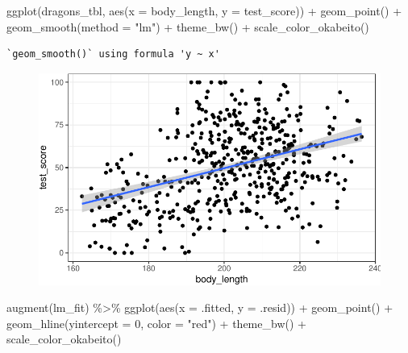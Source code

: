 \documentclass[
  letterpaper,
  DIV=11,
  oneside]{scrreport}
\newenvironment{Shaded}{\begin{snugshade}}{\end{snugshade}}
\newcommand{\AttributeTok}[1]{\textcolor[rgb]{0.40,0.45,0.13}{#1}}
\newcommand{\DecValTok}[1]{\textcolor[rgb]{0.68,0.00,0.00}{#1}}
\newcommand{\FunctionTok}[1]{\textcolor[rgb]{0.28,0.35,0.67}{#1}}
\newcommand{\NormalTok}[1]{\textcolor[rgb]{0.00,0.23,0.31}{#1}}
\newcommand{\SpecialCharTok}[1]{\textcolor[rgb]{0.37,0.37,0.37}{#1}}
\newcommand{\StringTok}[1]{\textcolor[rgb]{0.13,0.47,0.30}{#1}}
\begin{document}
\begin{Shaded}
\begin{Highlighting}[]
\FunctionTok{ggplot}\NormalTok{(dragons\_tbl, }\FunctionTok{aes}\NormalTok{(}\AttributeTok{x =}\NormalTok{ body\_length, }\AttributeTok{y =}\NormalTok{ test\_score)) }\SpecialCharTok{+}
  \FunctionTok{geom\_point}\NormalTok{() }\SpecialCharTok{+}
  \FunctionTok{geom\_smooth}\NormalTok{(}\AttributeTok{method =} \StringTok{"lm"}\NormalTok{) }\SpecialCharTok{+}
  \FunctionTok{theme\_bw}\NormalTok{() }\SpecialCharTok{+}
  \FunctionTok{scale\_color\_okabeito}\NormalTok{()}
\end{Highlighting}
\end{Shaded}

\begin{verbatim}
`geom_smooth()` using formula 'y ~ x'
\end{verbatim}

\begin{figure}[H]

{\centering \includegraphics{./stat-modeling-mixed_files/figure-pdf/unnamed-chunk-6-1.pdf}

}

\end{figure}

\begin{Shaded}
\begin{Highlighting}[]
\FunctionTok{augment}\NormalTok{(lm\_fit) }\SpecialCharTok{\%\textgreater{}\%} 
  \FunctionTok{ggplot}\NormalTok{(}\FunctionTok{aes}\NormalTok{(}\AttributeTok{x =}\NormalTok{ .fitted, }\AttributeTok{y =}\NormalTok{ .resid)) }\SpecialCharTok{+} 
  \FunctionTok{geom\_point}\NormalTok{() }\SpecialCharTok{+}
  \FunctionTok{geom\_hline}\NormalTok{(}\AttributeTok{yintercept =} \DecValTok{0}\NormalTok{, }\AttributeTok{color =} \StringTok{"red"}\NormalTok{) }\SpecialCharTok{+}
  \FunctionTok{theme\_bw}\NormalTok{() }\SpecialCharTok{+}
  \FunctionTok{scale\_color\_okabeito}\NormalTok{()}
\end{Highlighting}
\end{Shaded}
\end{document}
